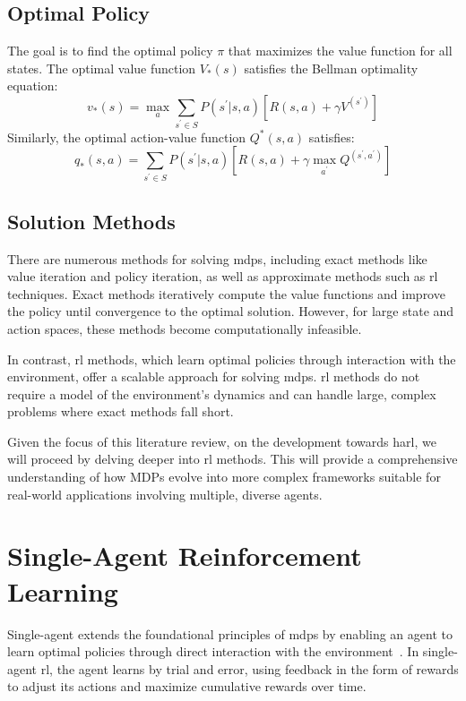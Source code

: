 \subsection*{Optimal Policy}
The goal is to find the optimal policy \(\pi\) that maximizes the value function for all states. 
The optimal value function \(V_*(s)\) satisfies the Bellman optimality equation:
\begin{equation}
    v_*(s) = \max_a \sum_{s^\prime \in S} P(s^\prime|s, a) [R(s, a) + \gamma V^(s^\prime)] 
\end{equation}
Similarly, the optimal action-value function \(Q^*(s, a)\) satisfies:
\begin{equation}
    q_*(s, a) = \sum_{s^\prime \in S} P(s^\prime|s, a) 
    [R(s, a) + \gamma \max_{a^\prime} Q^(s^\prime, a^\prime)] 
\end{equation}

\subsection*{Solution Methods}
There are numerous methods for solving \glspl{mdp}, including exact methods like 
value iteration and policy iteration, as well as approximate methods such as \gls{rl} techniques. 
Exact methods iteratively compute the value functions and improve 
the policy until convergence to the optimal solution. 
However, for large state and action spaces, these methods become computationally infeasible.

In contrast, \gls{rl} methods, which learn optimal policies through interaction with the 
environment, offer a scalable approach for solving \glspl{mdp}. 
\Gls{rl} methods do not require a model of the environment's dynamics and can handle large, 
complex problems where exact methods fall short.

Given the focus of this literature review, on the development towards \gls{harl}, 
we will proceed by delving deeper into \gls{rl} methods. 
This will provide a comprehensive understanding of how MDPs evolve into more complex frameworks
suitable for real-world applications involving multiple, diverse agents.


\section{Single-Agent Reinforcement Learning}

Single-agent  extends the foundational principles of \glspl{mdp} by enabling an 
agent to learn optimal policies through direct interaction with the environment~\cite{sutton2018}.
In single-agent \gls{rl}, the agent learns by trial and error, using feedback in the form of 
rewards to adjust its actions and maximize cumulative rewards over time.

